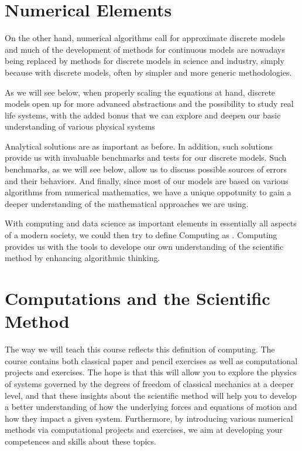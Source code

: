 \documentclass[letterpaper,10pt,english]{sphinxmanual}
\begin{document}
\chapter{Numerical Elements}
\label{\detokenize{chapter1:numerical-elements}}
On the other hand, numerical algorithms call for approximate discrete
models and much of the development of methods for continuous models
are nowadays being replaced by methods for discrete models in science and
industry, simply because  with discrete models, often  by simpler and more
generic methodologies.

As we will see below, when properly scaling the equations at hand,
discrete models open up for more advanced abstractions and the possibility to
study  real life systems, with the added bonus that we can explore and
deepen our basic understanding of various physical systems

Analytical solutions are as important as before. In addition, such
solutions provide us with invaluable benchmarks and tests for our
discrete models. Such benchmarks, as we will see below, allow us
to discuss possible sources of errors and their behaviors.  And
finally, since most of our models are based on various algorithms from
numerical mathematics, we have a unique oppotunity to gain a deeper
understanding of the mathematical approaches we are using.

With computing and data science as important elements in essentially
all aspects of a modern society, we could  then try to define Computing as
.
Computing provides us with the tools to develope our own understanding of the scientific method by enhancing algorithmic thinking.


\chapter{Computations and the Scientific Method}
\label{\detokenize{chapter1:computations-and-the-scientific-method}}
The way we will teach this course reflects
this definition of computing. The course contains both classical paper
and pencil exercises as well as  computational projects and exercises. The
hope is that this will allow you to explore the physics of systems
governed by the degrees of freedom of classical mechanics at a deeper
level, and that these insights about the scientific method will help
you to develop a better understanding of how the underlying forces and
equations of motion and how they impact a given system. Furthermore, by introducing various numerical methods
via computational projects and exercises, we aim at developing your competences and skills about these topics.
\end{document}

